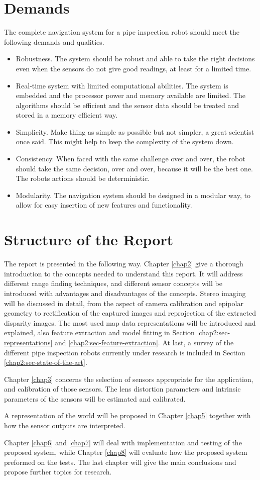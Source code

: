 \section{Demands}
The complete navigation system for a pipe inspection robot should meet the following
demands and qualities. 
\begin{itemize}
    \item Robustness. The system should be robust and able to take the right decisions
    even when the sensors do not give good readings, at least for a limited time.
    \item Real-time system with limited computational abilities. The system is embedded
    and the processor power and memory available are limited. The algorithms should be
    efficient and the sensor data should be treated and stored in a memory efficient way. 
    \item Simplicity. Make thing as simple as possible but not simpler, a great scientist
    once said. This might help to keep the complexity of the system down. 
    \item Consistency. When faced with the same challenge over and over, the robot should
    take the same decision, over and over, because it will be the best one. The robots
    actions should be deterministic. 
    \item Modularity. The navigation system should be designed in a modular way, to allow
    for easy insertion of new features and functionality. 
\end{itemize}


\section{Structure of the Report}
The report is presented in the following way. Chapter \ref{chap2} give a thorough
introduction to the concepts needed to understand this report. It will address different
range finding techniques, and different sensor concepts will be introduced with advantages
and disadvantages of the concepts. Stereo imaging will be discussed in detail, from the
aspect of camera calibration and epipolar geometry to rectification of the captured images and
reprojection of the extracted disparity images. The most used map data representations will be
introduced and explained, also feature extraction and model fitting in Section
\ref{chap2:sec-representations} and \ref{chap2:sec-feature-extraction}. At last, a survey
of the different pipe inspection robots currently under research is included in Section
\ref{chap2:sec-state-of-the-art}.

Chapter \ref{chap3} concerns the selection of sensors appropriate for the application, and
calibration of those sensors. The lens distortion parameters and intrinsic parameters of the
sensors will be estimated and calibrated. 

A representation of the world will be proposed in Chapter \ref{chap5} together with how the sensor
outputs are interpreted.

Chapter \ref{chap6} and \ref{chap7} will deal with implementation and testing of the
proposed system, while Chapter \ref{chap8} will evaluate how the proposed system preformed
on the tests. The last chapter will give the main conclusions and propose further topics
for research. 

